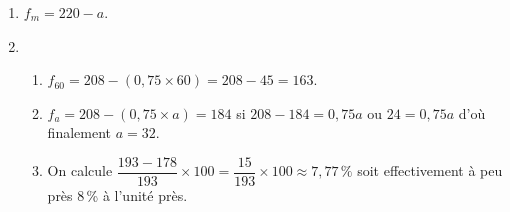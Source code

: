
\medskip

%
%

\begin{enumerate}
\item %
$f_m = 220 - a$. 
\item %



	\begin{enumerate}
		\item %
$f_{60} =  208 - (0,75 \times 60) = 208 - 45 = 163$.
		\item %
		$f_a = 208 - (0,75 \times a) = 184$ si $208 - 184 = 0,75a$ ou $24 = 0,75a$ d'où finalement $a = 32$. 
		\item %
		


On calcule $\dfrac{193 - 178}{193} \times 100 = \dfrac{15}{193} \times 100 \approx 7,77\,\%$ soit effectivement à peu près 8\,\% à l'unité près.
	\end{enumerate} 
\end{enumerate}

\vspace{0,5cm}

